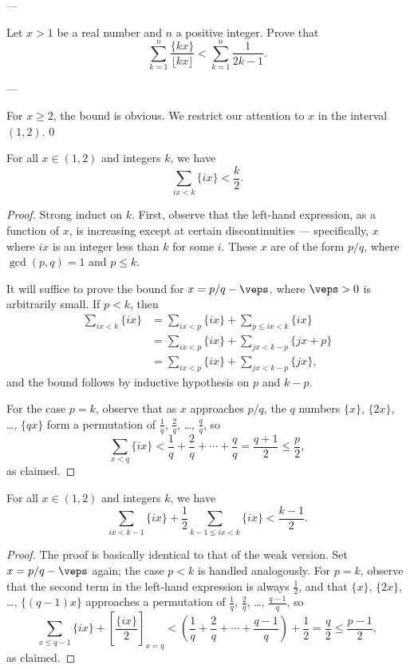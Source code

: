 
---

Let $x>1$ be a real number and $n$ a positive integer. Prove that \[\sum_{k=1}^n\frac{\{kx\}}{\lfloor kx\rfloor}<\sum_{k=1}^n\frac1{2k-1}.\]

---

For $x\ge2$, the bound is obvious. We restrict our attention to $x$ in the interval $(1,2)$.
\setcounter{lemma}0
\begin{lemma}
    For all $x\in(1,2)$ and integers $k$, we have
    \[\sum_{ix<k}\{ix\}<\frac k2.\]
\end{lemma}
\begin{proof}
    Strong induct on $k$. First, observe that the left-hand expression, as a function of $x$, is increasing except at certain discontinuities --- specifically, $x$ where $ix$ is an integer less than $k$ for some $i$. These $x$ are of the form $p/q$, where $\gcd(p,q)=1$ and $p\le k$.

    It will suffice to prove the bound for $x=p/q-\veps$, where $\veps>0$ is arbitrarily small. If $p<k$, then
    \begin{align*}
        \sum_{ix<k}\{ix\}&=\sum_{ix<p}\{ix\}+\sum_{p\le ix<k}\{ix\}\\
        &=\sum_{ix<p}\{ix\}+\sum_{jx<k-p}\{jx+p\}\\
        &=\sum_{ix<p}\{ix\}+\sum_{jx<k-p}\{jx\},
    \end{align*}
    and the bound follows by inductive hypothesis on $p$ and $k-p$.

    For the case $p=k$, observe that
    as $x$ approaches $p/q$, the $q$ numbers $\{x\}$, $\{2x\}$, \ldots, $\{qx\}$ form a permutation of $\frac1q$, $\frac2q$, \ldots, $\frac qq$, so \[\sum_{x<q}\{ix\}<\frac1q+\frac2q+\cdots+\frac qq=\frac{q+1}2\le\frac p2,\]
    as claimed.
\end{proof}
\begin{lemma}
    For all $x\in(1,2)$ and integers $k$, we have \[\sum_{ix<k-1}\{ix\}+\frac12\sum_{k-1\le ix<k}\{ix\}<\frac{k-1}2.\]
\end{lemma}
\begin{proof}
    The proof is basically identical to that of the weak version. Set $x=p/q-\veps$ again; the case $p<k$ is handled analogously. For $p=k$, observe that the second term in the left-hand expression is always $\frac12$, and that $\{x\}$, $\{2x\}$, \ldots, $\{(q-1)x\}$ approaches a permutation of $\frac1q$, $\frac2q$, \ldots, $\frac{q-1}q$, so \[\sum_{x\le q-1}\{ix\}+\left[\frac{\{ix\}}2\right]_{x=q}<\left(\frac1q+\frac2q+\cdots+\frac{q-1}q\right)+\frac12=\frac q2\le\frac{p-1}2,\]
    as claimed.
\end{proof}

